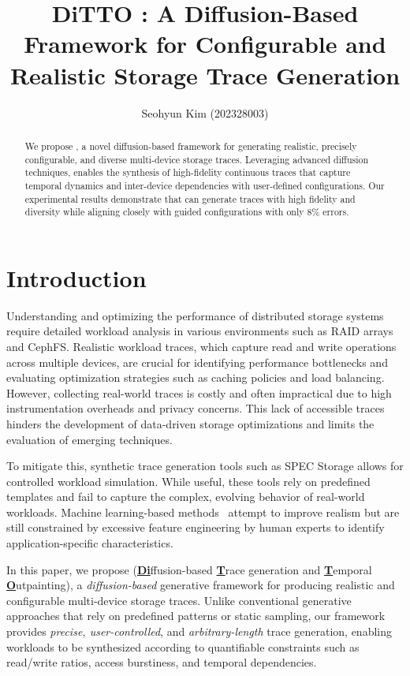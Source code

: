 \documentclass[
  manuscript=article,  %
  layout=preprint,  %
  year=20xx,
  volume=x,
]{extra/joas}
\title{DiTTO : A Diffusion-Based Framework for Configurable and Realistic Storage Trace Generation}
\author{Seohyun Kim (202328003)}
\affiliation{M.S. Candidate | Artificial Intelligence, DGIST }
\begin{document}
\begin{abstract}
We propose \Design, a novel diffusion-based framework for generating realistic, precisely configurable, and diverse multi-device storage traces. Leveraging advanced diffusion techniques, \Design enables the synthesis of high-fidelity continuous traces that capture temporal dynamics and inter-device dependencies with user-defined configurations. Our experimental results demonstrate that \Design can generate traces with high fidelity and diversity while aligning closely with guided configurations with only 8\% errors.
\end{abstract}


\section{Introduction}


Understanding and optimizing the performance of distributed storage systems require detailed workload analysis in various environments such as RAID arrays and CephFS. Realistic workload traces, which capture read and write operations across multiple devices, are crucial for identifying performance bottlenecks and evaluating optimization strategies such as caching policies and load balancing. However, collecting real-world traces is costly and often impractical due to high instrumentation overheads and privacy concerns. This lack of accessible traces hinders the development of data-driven storage optimizations and limits the evaluation of emerging techniques.

To mitigate this, synthetic trace generation tools such as SPEC Storage allows for controlled workload simulation. While useful, these tools rely on predefined templates and fail to capture the complex, evolving behavior of real-world workloads. Machine learning-based methods~\cite{paul2022machine} attempt to improve realism but are still constrained by excessive feature engineering by human experts to identify application-specific characteristics.

In this paper, we propose \Design (\underline{\textbf{Di}}ffusion-based \underline{\textbf{T}}race generation and \underline{\textbf{T}}emporal \underline{\textbf{O}}utpainting), a \textit{diffusion-based} generative framework for producing realistic and configurable multi-device storage traces. Unlike conventional generative approaches that rely on predefined patterns or static sampling, our framework provides \textit{precise, user-controlled}, and \textit{arbitrary-length} trace generation, enabling workloads to be synthesized according to quantifiable constraints such as read/write ratios, access burstiness, and temporal dependencies.
\end{document}
